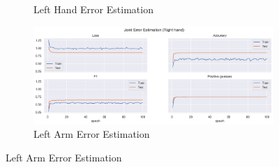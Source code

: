 \begin{figure}[!ht]
\begin{subfigure}[b]{0.47\linewidth}
      \caption{Left Hand Error Estimation}
      \label{fig:v1_leha_jt_ee}
  \end{subfigure}
  \hfill
  \begin{subfigure}[b]{0.47\linewidth}
      \centering
      \includegraphics[width=\textwidth]{figures/Results/v1_bs_60_is_64_e_100/jt/Right hand_ErrorEstimation.png}
      \caption{Left Arm Error Estimation}
      \label{fig:v1_riha_jt_ee}
  \end{subfigure}
\end{figure}

